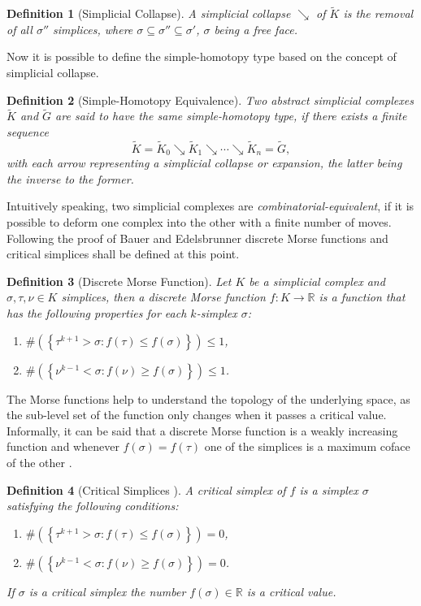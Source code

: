 \documentclass[journal]{IEEEtran}
\newtheorem{definition}{Definition}[section]
\begin{document}
\begin{definition}[Simplicial Collapse]
A simplicial collapse $\searrow$ of $\tilde{K}$ is the removal of all $\sigma''$ simplices, where $\sigma \subseteq \sigma'' \subseteq \sigma'$, $\sigma$ being a free face.
\end{definition}

Now it is possible to define the simple-homotopy type based on the concept of simplicial collapse.

\begin{definition}[Simple-Homotopy Equivalence]
Two abstract simplicial complexes $\tilde{K}$ and $\tilde{G}$ are said to have the same simple-homotopy type, if there exists a finite sequence
\[
\tilde{K}=\tilde{K}_0 \searrow \tilde{K}_1 \searrow \cdots \searrow \tilde{K}_n = \tilde{G},
\]
with each arrow representing a simplicial collapse or expansion, the latter being the inverse to the former.
\end{definition}

Intuitively speaking, two simplicial complexes are \textit{combinatorial-equivalent}, if it is possible to deform one complex into the other with a finite number of moves. Following the proof of Bauer and Edelsbrunner discrete Morse functions and critical simplices shall be defined at this point.

\begin{definition}[Discrete Morse Function]
\label{def:morse}
Let $K$ be a simplicial complex and $\sigma,\tau,\nu \in K$ simplices, then a discrete Morse function $f: K \rightarrow \mathbb{R}$ is a function that has the following properties for each $k$-simplex $\sigma$:
\begin{enumerate}
  \item $\#\left( \left\{ \tau^{k+1} > \sigma: f(\tau) \leq f(\sigma) \right\} \right) \leq 1$,
  \item $\#\left( \left\{ \nu^{k-1} < \sigma: f(\nu) \geq f(\sigma) \right\} \right) \leq 1$.
\end{enumerate}
\end{definition}

The Morse functions help to understand the topology of the underlying space, as the sub-level set of the function only changes when it passes a critical value. Informally, it can be said that a discrete Morse function is a weakly increasing function and whenever $f(\sigma) = f(\tau)$ one of the simplices is a maximum coface of the other \cite{fernandez2016strong}.

\begin{definition}[Critical Simplices \cite{fernandez2016strong}]
A critical simplex of $f$ is a simplex $\sigma$ satisfying the following conditions:
\begin{enumerate}
  \item $\#\left( \left\{ \tau^{k+1} > \sigma: f(\tau) \leq f(\sigma) \right\} \right) = 0$,
  \item $\#\left( \left\{ \nu^{k-1} < \sigma: f(\nu) \geq f(\sigma) \right\} \right) = 0$.
\end{enumerate}
If $\sigma$ is a critical simplex the number $f(\sigma) \in \mathbb{R}$ is a critical value.
\end{definition}
\end{document}
